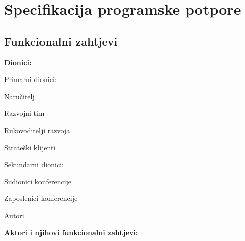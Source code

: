 \chapter{Specifikacija programske potpore}
		
	\section{Funkcionalni zahtjevi}


			
			\noindent \textbf{Dionici:}
			
			\begin{packed_enum}
				
				\item Primarni dionici:
				
				\begin{packed_enum}
					\item Naručitelj
					\item Razvojni tim
					\item Rukovoditelji razvoja
					\item Strateški klijenti	
				\end{packed_enum}
				
				\item Sekundarni dionici:	
				
				\begin{packed_enum}
					\item Sudionici konferencije
					\item Zaposlenici konferencije
					\item Autori	
				\end{packed_enum}		
				
			\end{packed_enum}
			
			\noindent \textbf{Aktori i njihovi funkcionalni zahtjevi:}
			
